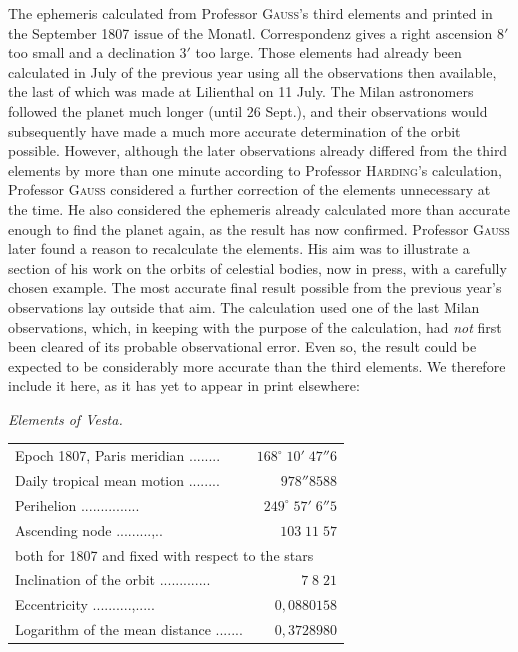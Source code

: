 \par\indent The ephemeris calculated from Professor \textsc{Gauss}’s third elements and printed in the September 1807 issue of the Monatl. Correspondenz gives a right ascension $8'$ too small and a declination $3'$ too large. Those elements had already been calculated in July of the previous year using all the observations then available, the last of which was made at Lilienthal on 11 July. The Milan astronomers followed the planet much longer (until 26 Sept.), and their observations would subsequently have made a much more accurate determination of the orbit possible. However, although the later observations already differed from the third elements by more than one minute according to Professor \textsc{Harding}’s calculation, Professor \textsc{Gauss} considered a further correction of the elements unnecessary at the time. He also considered the ephemeris already calculated more than accurate enough to find the planet again, as the result has now confirmed. Professor \textsc{Gauss} later found a reason to recalculate the elements. His aim was to illustrate a section of his work on the orbits of celestial bodies, now in press, with a carefully chosen example. The most accurate final result possible from the previous year’s observations lay outside that aim. The calculation used one of the last Milan observations, which, in keeping with the purpose of the calculation, had \emph{not} first been cleared of its probable observational error. Even so, the result could be expected to be considerably more accurate than the third elements. We therefore include it here, as it has yet to appear in print elsewhere:

\begin{center}
\emph{Elements of Vesta.}
\end{center}


\begin{center}\fontsize{9}{11}\selectfont\setlength{\tabcolsep}{3pt}\renewcommand{\arraystretch}{1.15}\begin{tabular}{lr}
Epoch 1807, Paris meridian .\;.\;.\;.\;.\;.\;.\;.\; & $168^\circ\;10'\;47''6$\\
Daily tropical mean motion .\;.\;.\;.\;.\;.\;.\;.\; & $978''8588$\\
Perihelion .\;.\;.\;.\;.\;.\;.\;.\;.\;.\;.\;.\;.\;.\;.\; & $249^\circ\;57'\;6''5$\\
Ascending node .\;.\;.\;.\;.\;.\;.\;.\;.\;,\;.\;.\; & $103\;11\;57$\\
\multicolumn{2}{l}{\quad both for 1807 and fixed with respect to the stars}\\
Inclination of the orbit .\;.\;.\;.\;.\;.\;.\;.\;.\;.\;.\;.\;.\; & $7\;8\;21$\\
Eccentricity .\;.\;.\;.\;.\;.\;.\;.\;.\;.\;,\;.\;.\;.\;.\;.\; & $0{,}0880158$\\
Logarithm of the mean distance .\;.\;.\;\hspace{.5em}.\;.\;.\;.\; & $0{,}3728980$\\
\end{tabular}\end{center}



